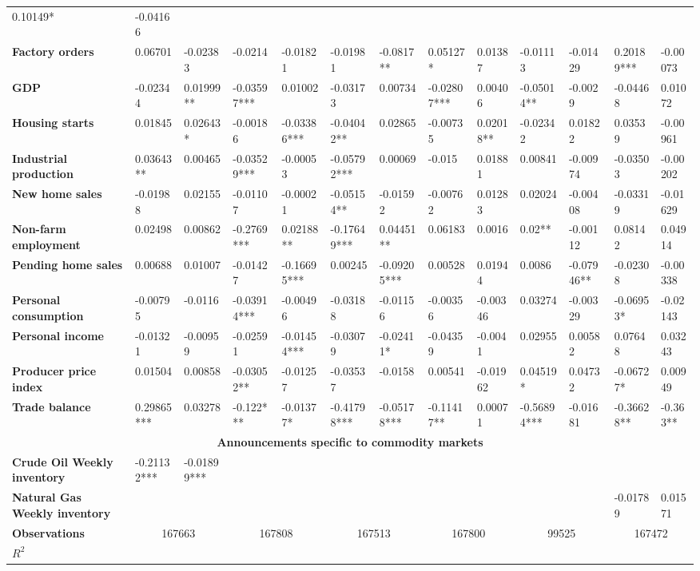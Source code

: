 \begin{sidewaystable}
{\begin{tabular}{@{}lllllllllllll@{}}
0.10149* & -0.04166 \\ \textbf{Factory orders}& 0.06701 & -0.02383 & -0.0214 & -0.01821 & -0.01981 & -0.0817** & 0.05127* & 0.01387 & -0.01113 & -0.01429 & 0.20189*** & -0.00073 \\ \textbf{GDP}& -0.02344 & 0.01999** & -0.03597*** & 0.01002 & -0.03173 & 0.00734 & -0.02807*** & 0.00406 & -0.05014** & -0.0029 & -0.04468 & 0.01072 \\ \textbf{Housing starts}& 0.01845 & 0.02643* & -0.00186 & -0.03386*** & -0.04042** & 0.02865 & -0.00735 & 0.02018** & -0.02342 & 0.01822 & 0.03539 & -0.00961 \\ \textbf{Industrial production}& 0.03643**& 0.00465 & -0.03529*** & -0.00053 & -0.05792*** & 0.00069 & -0.015 & 0.01881 & 0.00841 & -0.00974 & -0.03503 & -0.00202 \\ \textbf{New home sales}& -0.01988 & 0.02155 & -0.01107 & -0.00021 & -0.05154** & -0.01592 & -0.00762 & 0.01283 & 0.02024 & -0.00408 & -0.03319 & -0.01629 \\ \textbf{Non-farm employment}& 0.02498 & 0.00862 & -0.2769*** & 0.02188** & -0.17649*** & 0.04451** & 0.06183 & 0.0016 & 0.02** & -0.00112 & 0.08142 & 0.04914 \\ \textbf{Pending home sales}& 0.00688 & 0.01007 & -0.01427 & -0.16695*** & 0.00245 & -0.09205*** & 0.00528 & 0.01944 & 0.0086 & -0.07946** & -0.02308 & -0.00338 \\ \textbf{Personal consumption}& -0.00795 & -0.0116 & -0.03914*** & -0.00496 & -0.03188 & -0.01156 & -0.00356 & -0.00346 & 0.03274 & -0.00329 & -0.06953* & -0.02143 \\ \textbf{Personal income}& -0.01321 & -0.00959 & -0.02591 & -0.01454*** & -0.03079 & -0.02411* & -0.04359 & -0.0041 & 0.02955 & 0.00582 & 0.07648 & 0.03243 \\ \textbf{Producer price index}& 0.01504 & 0.00858 & -0.03052** & -0.01257 & -0.03537 & -0.0158 & 0.00541 & -0.01962 & 0.04519* & 0.04732 & -0.06727* & 0.00949 \\ \textbf{Trade balance}& 0.29865***& 0.03278 & -0.122*** & -0.01377* & -0.41798*** & -0.05178*** & -0.11417** & 0.00071 & -0.56894*** & -0.01681 & -0.36628** & -0.363** \\  \midrule \multicolumn{13}{c}{\textbf{Announcements specific to commodity markets}} \\ \midrule \textbf{Crude Oil Weekly inventory}& -0.21132*** & -0.01899*** &  &  &  &  &  &  &  &  &  &  \\ \textbf{Natural Gas Weekly inventory}&  &  &  &  &  &  &  &  &  &  & -0.01789 & 0.01571 \\  \midrule \textbf{Observations}             &\multicolumn{2}{c}{ 167663 }                                                 & \multicolumn{2}{c}{ 167808 }                                                 & \multicolumn{2}{c}{ 167513 }                                                 & \multicolumn{2}{c}{ 167800 }                                                 & \multicolumn{2}{c}{ 99525 }                                                   & \multicolumn{2}{c}{ 167472 }                                                 \\ \textbf{$R^2$}             
\end{tabular}}
\end{sidewaystable}
